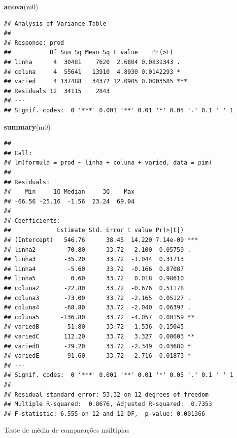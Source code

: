 \documentclass[
]{book}
\newenvironment{Shaded}{\begin{snugshade}}{\end{snugshade}}
\newcommand{\KeywordTok}[1]{\textcolor[rgb]{0.13,0.29,0.53}{\textbf{#1}}}
\newcommand{\NormalTok}[1]{#1}
\begin{document}
\begin{Shaded}
\begin{Highlighting}[]
\KeywordTok{anova}\NormalTok{(m0)}
\end{Highlighting}
\end{Shaded}

\begin{verbatim}
## Analysis of Variance Table
## 
## Response: prod
##           Df Sum Sq Mean Sq F value    Pr(>F)    
## linha      4  30481    7620  2.6804 0.0831343 .  
## coluna     4  55641   13910  4.8930 0.0142293 *  
## varied     4 137488   34372 12.0905 0.0003585 ***
## Residuals 12  34115    2843                      
## ---
## Signif. codes:  0 '***' 0.001 '**' 0.01 '*' 0.05 '.' 0.1 ' ' 1
\end{verbatim}

\begin{Shaded}
\begin{Highlighting}[]
\KeywordTok{summary}\NormalTok{(m0)}
\end{Highlighting}
\end{Shaded}

\begin{verbatim}
## 
## Call:
## lm(formula = prod ~ linha + coluna + varied, data = pim)
## 
## Residuals:
##    Min     1Q Median     3Q    Max 
## -66.56 -25.16  -1.56  23.24  69.04 
## 
## Coefficients:
##             Estimate Std. Error t value Pr(>|t|)    
## (Intercept)   546.76      38.45  14.220 7.14e-09 ***
## linha2         70.80      33.72   2.100  0.05759 .  
## linha3        -35.20      33.72  -1.044  0.31713    
## linha4         -5.60      33.72  -0.166  0.87087    
## linha5          0.60      33.72   0.018  0.98610    
## coluna2       -22.80      33.72  -0.676  0.51178    
## coluna3       -73.00      33.72  -2.165  0.05127 .  
## coluna4       -68.80      33.72  -2.040  0.06397 .  
## coluna5      -136.80      33.72  -4.057  0.00159 ** 
## variedB       -51.80      33.72  -1.536  0.15045    
## variedC       112.20      33.72   3.327  0.00603 ** 
## variedD       -79.20      33.72  -2.349  0.03680 *  
## variedE       -91.60      33.72  -2.716  0.01873 *  
## ---
## Signif. codes:  0 '***' 0.001 '**' 0.01 '*' 0.05 '.' 0.1 ' ' 1
## 
## Residual standard error: 53.32 on 12 degrees of freedom
## Multiple R-squared:  0.8676, Adjusted R-squared:  0.7353 
## F-statistic: 6.555 on 12 and 12 DF,  p-value: 0.001366
\end{verbatim}

Teste de média de comparações múltiplas
\end{document}
